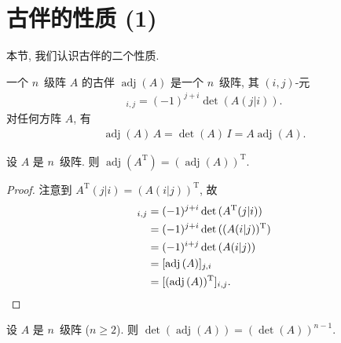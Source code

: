 \section{古伴的性质 (1)}

本节, 我们认识古伴的二个性质.

一个 \(n\)~级阵 \(A\) 的古伴 \(\operatorname{adj} {(A)}\)
是一个 \(n\)~级阵,
其 \((i, j)\)-元
\begin{align*}
    [\operatorname{adj} {(A)}]_{i,j} = (-1)^{j+i} \det {(A(j|i))}.
\end{align*}
对任何方阵 \(A\), 有
\begin{align*}
    \operatorname{adj} {(A)}\, A
    = \det {(A)}\, I
    = A \operatorname{adj} {(A)}.
\end{align*}

\begin{theorem}
    设 \(A\) 是 \(n\)~级阵.
    则 \(\operatorname{adj} {(A^{\mathrm{T}})}
    = (\operatorname{adj} {(A)})^{\mathrm{T}}\).
\end{theorem}

\begin{proof}
    注意到
    \(A^{\mathrm{T}} (j|i) = (A (i|j))^{\mathrm{T}}\),
    故
    \begin{align*}
        [\operatorname{adj} {(A^{\mathrm{T}})}]_{i,j}
        = {} &
        (-1)^{j+i} \det {(A^{\mathrm{T}} (j|i))}
        \\
        = {} &
        (-1)^{j+i} \det {((A (i|j))^{\mathrm{T}})}
        \\
        = {} &
        (-1)^{i+j} \det {(A (i|j))}
        \\
        = {} &
        [\operatorname{adj} {(A)}]_{j,i}
        \\
        = {} &
        [(\operatorname{adj} {(A)})^{\mathrm{T}}]_{i,j}.
        \qedhere
    \end{align*}
\end{proof}

\begin{theorem}
    设 \(A\) 是 \(n\)~级阵 (\(n \geq 2\)).
    则
    \(\det {(\operatorname{adj} {(A)})} = (\det {(A)})^{n-1}\).
\end{theorem}

